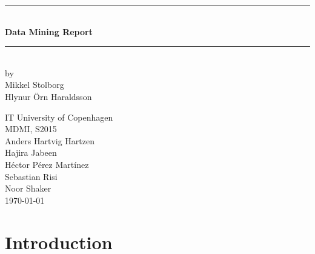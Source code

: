 \documentclass[a4paper,11pt]{article}
\begin{document}
\begin{titlepage}

\centering \parindent=0pt
\newcommand{\HRule}{\rule{\textwidth}{1mm}}
 \HRule\\[1cm]\Huge\bfseries
Data Mining Report\\[0.7cm]
\HRule\\[4cm]  
\large by 
\\ Mikkel Stolborg
\\ Hlynur Örn Haraldsson
 \normalsize %
\begin{flushleft}
IT University of Copenhagen \\
MDMI, S2015\\
Anders Hartvig Hartzen\\
Hajira Jabeen\\
Héctor Pérez Martínez\\
Sebastian Risi\\
Noor Shaker\\
\today \end{flushleft}
\end{titlepage}

\tableofcontents
\pagebreak
\section{Introduction}
\end{document}
